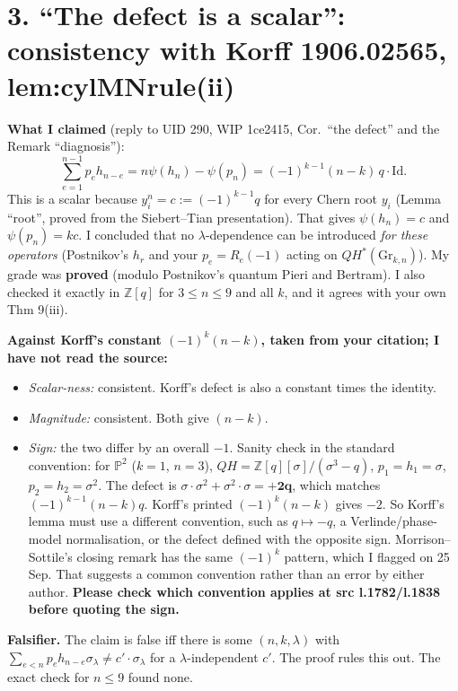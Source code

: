 \documentclass[11pt]{amsart}
\newcommand{\Z}{\mathbb{Z}}
\begin{document}
\section*{3. ``The defect is a scalar'': consistency with Korff 1906.02565, lem:cylMNrule(ii)}

\noindent\textbf{What I claimed} (reply to UID 290, WIP 1ce2415, Cor.\ ``the defect'' and the Remark ``diagnosis''):
\[
\sum_{e=1}^{n-1}p_e h_{n-e}=n\psi(h_n)-\psi(p_n)=(-1)^{k-1}(n-k)\,q\cdot\mathrm{Id}.
\]
This is a scalar because $y_i^n=c:=(-1)^{k-1}q$ for every Chern root $y_i$ (Lemma ``root'', proved from the Siebert--Tian presentation). That gives $\psi(h_n)=c$ and $\psi(p_n)=kc$. I concluded that no $\lambda$-dependence can be introduced \emph{for these operators} (Postnikov's $h_r$ and your $p_e=R_e(-1)$ acting on $QH^*(\mathrm{Gr}_{k,n})$). My grade was \textbf{proved} (modulo Postnikov's quantum Pieri and Bertram). I also checked it exactly in $\Z[q]$ for $3\le n\le9$ and all $k$, and it agrees with your own Thm 9(iii).

\smallskip\noindent\textbf{Against Korff's constant $(-1)^k(n-k)$, taken from your citation; I have not read the source:}
\begin{itemize}[leftmargin=2em]
\item \emph{Scalar-ness:} consistent. Korff's defect is also a constant times the identity.
\item \emph{Magnitude:} consistent. Both give $(n-k)$.
\item \emph{Sign:} the two differ by an overall $-1$. Sanity check in the standard convention: for $\mathbb{P}^2$ ($k=1$, $n=3$), $QH=\Z[q][\sigma]/(\sigma^3-q)$, $p_1=h_1=\sigma$, $p_2=h_2=\sigma^2$. The defect is $\sigma\cdot\sigma^2+\sigma^2\cdot\sigma=\mathbf{+2q}$, which matches $(-1)^{k-1}(n-k)q$. Korff's printed $(-1)^k(n-k)$ gives $-2$. So Korff's lemma must use a different convention, such as $q\mapsto-q$, a Verlinde/phase-model normalisation, or the defect defined with the opposite sign. Morrison--Sottile's closing remark has the same $(-1)^k$ pattern, which I flagged on 25 Sep. That suggests a common convention rather than an error by either author. \textbf{Please check which convention applies at src l.1782/l.1838 before quoting the sign.}
\end{itemize}

\noindent\textbf{Falsifier.} The claim is false iff there is some $(n,k,\lambda)$ with $\sum_{e<n}p_eh_{n-e}\sigma_\lambda\ne c'\cdot\sigma_\lambda$ for a $\lambda$-independent $c'$. The proof rules this out. The exact check for $n\le9$ found none.
\end{document}
